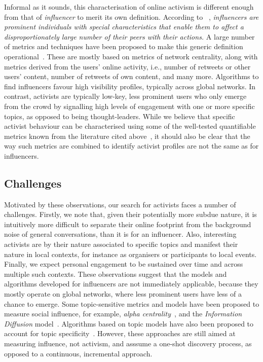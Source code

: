 \documentclass[runningheads]{llncs}
\begin{document}
Informal as it sounds, this characterisation of online activism is different enough from that of \textit{influencer} to merit its own definition.
According to ~\cite{Kardara2015}, \textit{influencers are prominent individuals with special characteristics that enable them to	affect a disproportionately large number of their peers with their actions.}
A large number of metrics and techniques have been proposed to make this generic definition operational~\cite{RIQUELME2016949}. These are mostly based on metrics of network centrality, along with metrics derived from the users' online activity, i.e., number of retweets or other users' content, number of retweets of own content, and many more.
%
Algorithms to find influencers favour high visibility profiles, typically across global networks.
In contrast, activists are typically low-key, less prominent users who only emerge from the crowd by signalling high levels of engagement with one or more specific topics, as opposed to being thought-leaders.
%
While we believe that specific activist behaviour can be characterised using some of the well-tested quantifiable metrics known from the literature  cited above~\cite{RIQUELME2016949}, it should also be clear that the way such metrics are combined to identify activist profiles are not the same as for influencers. 

\subsection{Challenges}

Motivated by these observations, our search for activists faces a number of challenges.
%
Firstly, we note that, given their potentially  more subdue nature, it is intuitively more difficult to separate their online footprint from the background noise of general conversations, than it is for an influencer.
Also, interesting activists are by their nature associated to specific topics and manifest their nature in local contexts, for instance as organisers or participants to local events. 
Finally, we expect personal engagement to be sustained over time and across multiple such contexts. 
These observations suggest that the models and algorithms developed for influencers are not immediately applicable, because they mostly operate on global networks, where less prominent users have less of a chance to emerge. 
Some topic-sensitive metrics and models have been proposed to measure social influence, for example, \textit{alpha centrality}~\cite{Bonacich2001,Overbey2013}, and the \textit{Information Diffusion} model~\cite{Pal2011}. Algorithms based on topic models have also been proposed to account for topic specificity~\cite{Zhao2011b}.  However, these approaches are still aimed at measuring influence, not activism, and asssume a one-shot discovery process, as opposed to a continuous, incremental approach.
\end{document}
